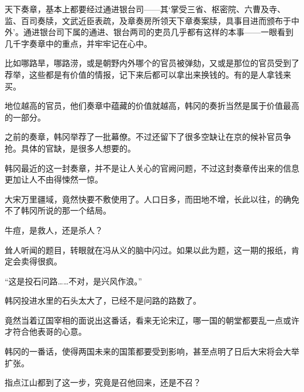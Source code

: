 天下奏章，基本上都要经过通进银台司——其‘掌受三省、枢密院、六曹及寺、监、百司奏牍，文武近臣表疏，及章奏房所领天下章奏案牍，具事目进而颁布于中外’。通进银台司下属的通进、银台两司的吏员几乎都有这样的本事——一眼看到几千字奏章中的重点，并牢牢记在心中。

比如哪路旱，哪路涝，或是朝野内外哪个的官员被弹劾，又或是那位的官员受到了荐举，这些都是有价值的情报，记下来后都可以拿出来换钱的。有的是人拿钱来买。

地位越高的官员，他们奏章中蕴藏的价值就越高，韩冈的奏折当然是属于价值最高的一部分。

之前的奏章，韩冈举荐了一批幕僚。不过还留下了很多空缺让在京的候补官员争抢。具体的官缺，是很多人想要的。

韩冈最近的这一封奏章，并不是让人关心的官阙问题，不过这封奏章传出来的信息更加让人不由得悚然一惊。

大宋万里疆域，竟然快要不敷使用了。人口日多，而田地不增，长此以往，的确免不了韩冈所说的那一个结局。

牛痘，是救人，还是杀人？

耸人听闻的题目，转眼就在冯从义的脑中闪过。如果以此为题，这一期的报纸，肯定会卖得很疯。

“这是投石问路……不对，是兴风作浪。”

韩冈投进水里的石头太大了，已经不是问路的路数了。

竟然当着辽国宰相的面说出这番话，看来无论宋辽，哪一国的朝堂都要乱一点或许才符合他表哥的心意。

韩冈的一番话，使得两国未来的国策都要受到影响，甚至点明了日后大宋将会大举扩张。

指点江山都到了这一步，究竟是召他回来，还是不召？
